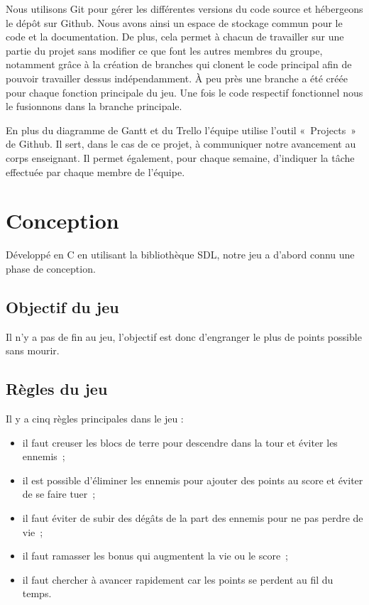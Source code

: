 \documentclass[a4paper,12pt]{article}
\begin{document}
Nous utilisons Git pour gérer les différentes versions du code source et hébergeons le dépôt sur Github.
Nous avons ainsi un espace de stockage commun pour le code et la documentation. De plus, cela permet à chacun de travailler sur une partie du projet sans modifier ce que font les autres membres du groupe, notamment grâce à la création de branches qui clonent le code principal afin de pouvoir travailler dessus indépendamment.
À peu près une branche a été créée pour chaque fonction principale du jeu. Une fois le code respectif fonctionnel nous le fusionnons dans la branche principale.

En plus du diagramme de Gantt et du Trello l’équipe utilise l’outil « Projects » de Github.
Il sert, dans le cas de ce projet, à communiquer notre avancement au corps enseignant. 
Il permet également, pour chaque semaine, d’indiquer la tâche effectuée par chaque membre de l’équipe.



\section{Conception}

Développé en C en utilisant la bibliothèque SDL, notre jeu a d'abord connu une phase de conception.

\subsection{Objectif du jeu}
Il n’y a pas de fin au jeu, l’objectif est donc d’engranger le plus de points possible sans mourir.

\subsection{Règles du jeu}
Il y a cinq règles principales dans le jeu :
\begin{itemize}
	\item il faut creuser les blocs de terre pour descendre dans la tour et éviter les ennemis ;
	\item il est possible d’éliminer les ennemis pour ajouter des points au score et éviter de se faire tuer ;
	\item il faut éviter de subir des dégâts de la part des ennemis pour ne pas perdre de vie ;
	\item il faut ramasser les bonus qui augmentent la vie ou le score ;
	\item il faut chercher à avancer rapidement car les points se perdent au fil du temps.
\end{itemize}
\end{document}
